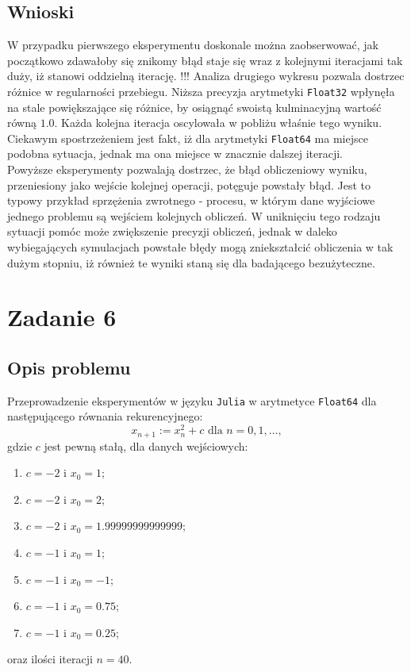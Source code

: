 \documentclass{classrep}
\begin{document}
	\subsection{Wnioski}
		W przypadku pierwszego eksperymentu doskonale można zaobserwować, jak początkowo zdawałoby się znikomy błąd staje się wraz z kolejnymi iteracjami tak duży, iż stanowi oddzielną iterację. !!!
		Analiza drugiego wykresu pozwala dostrzec różnice w regularności przebiegu. Niższa precyzja arytmetyki \texttt{Float32} wpłynęła na stale powiększające się różnice, by osiągnąć swoistą kulminacyjną wartość równą $1.0$. Każda kolejna iteracja oscylowała w pobliżu właśnie tego wyniku.
		Ciekawym spostrzeżeniem jest fakt, iż dla arytmetyki \texttt{Float64} ma miejsce podobna sytuacja, jednak ma ona miejsce w znacznie dalszej iteracji.
		\\ Powyższe eksperymenty pozwalają dostrzec, że błąd obliczeniowy wyniku, przeniesiony jako wejście kolejnej operacji, potęguje powstały błąd. Jest to typowy przykład sprzężenia zwrotnego - procesu, w którym dane wyjściowe jednego problemu są wejściem kolejnych obliczeń.
		W uniknięciu tego rodzaju sytuacji pomóc może zwiększenie precyzji obliczeń, jednak w daleko wybiegających symulacjach powstałe błędy mogą zniekształcić obliczenia w tak dużym stopniu, iż również te wyniki staną się dla badającego bezużyteczne.
\section{Zadanie 6}
	\subsection{Opis problemu}
		Przeprowadzenie eksperymentów w języku \texttt{Julia} w arytmetyce \texttt{Float64} dla następującego równania rekurencyjnego:
		$$x_{n+1} := x^{2}_{n} + c \text{ dla } n = 0, 1, \dots,$$
		gdzie $c$ jest pewną stałą, dla danych wejściowych:
		\begin{enumerate}
			\item $c = -2$ i $x_0 = 1$;
			\item $c = -2$ i $x_0 = 2$;
			\item $c = -2$ i $x_0 = 1.99999999999999$;
			\item $c = -1$ i $x_0 = 1$;
			\item $c = -1$ i $x_0 = -1$;
			\item $c = -1$ i $x_0 = 0.75$;
			\item $c = -1$ i $x_0 = 0.25$;
		\end{enumerate}
		oraz ilości iteracji $n = 40$.
\end{document}
